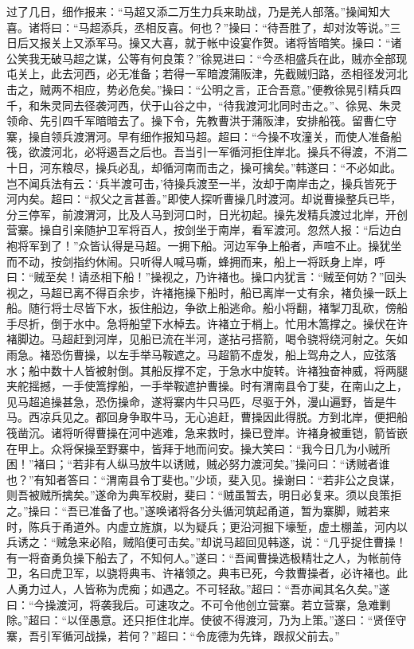 过了几日，细作报来：“马超又添二万生力兵来助战，乃是羌人部落。”操闻知大喜。诸将曰：“马超添兵，丞相反喜。何也？”操曰：“待吾胜了，却对汝等说。”三日后又报关上又添军马。操又大喜，就于帐中设宴作贺。诸将皆暗笑。操曰：“诸公笑我无破马超之谋，公等有何良策？”徐晃进曰：“今丞相盛兵在此，贼亦全部现屯关上，此去河西，必无准备；若得一军暗渡蒲阪津，先截贼归路，丞相径发河北击之，贼两不相应，势必危矣。”操曰：“公明之言，正合吾意。”便教徐晃引精兵四千，和朱灵同去径袭河西，伏于山谷之中，“待我渡河北同时击之。”、徐晃、朱灵领命、先引四千军暗暗去了。操下令，先教曹洪于蒲阪津，安排船筏。留曹仁守寨，操自领兵渡渭河。早有细作报知马超。超曰：“今操不攻潼关，而使人准备船筏，欲渡河北，必将遏吾之后也。吾当引一军循河拒住岸北。操兵不得渡，不消二十日，河东粮尽，操兵必乱，却循河南而击之，操可擒矣。”韩遂曰：“不必如此。岂不闻兵法有云：‘兵半渡可击，’待操兵渡至一半，汝却于南岸击之，操兵皆死于河内矣。超曰：“叔父之言甚善。”即使人探听曹操几时渡河。却说曹操整兵已毕，分三停军，前渡渭河，比及人马到河口时，日光初起。操先发精兵渡过北岸，开创营寨。操自引亲随护卫军将百人，按剑坐于南岸，看军渡河。忽然人报：“后边白袍将军到了！”众皆认得是马超。一拥下船。河边军争上船者，声喧不止。操犹坐而不动，按剑指约休闹。只听得人喊马嘶，蜂拥而来，船上一将跃身上岸，呼曰：“贼至矣！请丞相下船！”操视之，乃许褚也。操口内犹言：“贼至何妨？”回头视之，马超已离不得百余步，许褚拖操下船时，船已离岸一丈有余，褚负操一跃上船。随行将士尽皆下水，扳住船边，争欲上船逃命。船小将翻，褚掣刀乱砍，傍船手尽折，倒于水中。急将船望下水棹去。许褚立于梢上。忙用木篙撑之。操伏在许褚脚边。马超赶到河岸，见船已流在半河，遂拈弓搭箭，喝令骁将绕河射之。矢如雨急。褚恐伤曹操，以左手举马鞍遮之。马超箭不虚发，船上驾舟之人，应弦落水；船中数十人皆被射倒。其船反撑不定，于急水中旋转。许褚独奋神威，将两腿夹舵摇撼，一手使篙撑船，一手举鞍遮护曹操。时有渭南县令丁斐，在南山之上，见马超追操甚急，恐伤操命，遂将寨内牛只马匹，尽驱于外，漫山遍野，皆是牛马。西凉兵见之。都回身争取牛马，无心追赶，曹操因此得脱。方到北岸，便把船筏凿沉。诸将听得曹操在河中逃难，急来救时，操已登岸。许褚身被重铠，箭皆嵌在甲上。众将保操至野寨中，皆拜于地而问安。操大笑曰：“我今日几为小贼所困！”褚曰；“若非有人纵马放牛以诱贼，贼必努力渡河矣。”操问曰：“诱贼者谁也？”有知者答曰：“渭南县令丁斐也。”少顷，斐入见。操谢曰：“若非公之良谋，则吾被贼所擒矣。”遂命为典军校尉，斐曰：“贼虽暂去，明日必复来。须以良策拒之。”操曰：“吾已准备了也。”遂唤诸将各分头循河筑起甬道，暂为寨脚，贼若来时，陈兵于甬道外。内虚立旌旗，以为疑兵；更沿河掘下壕堑，虚土棚盖，河内以兵诱之：“贼急来必陷，贼陷便可击矣。”却说马超回见韩遂，说：“几乎捉住曹操！有一将奋勇负操下船去了，不知何人。”遂曰：“吾闻曹操选极精壮之人，为帐前侍卫，名曰虎卫军，以骁将典韦、许褚领之。典韦已死，今救曹操者，必许褚也。此人勇力过人，人皆称为虎痴；如遇之。不可轻敌。”超曰：“吾亦闻其名久矣。”遂曰：“今操渡河，将袭我后。可速攻之。不可令他创立营寨。若立营寨，急难剿除。”超曰：“以侄愚意。还只拒住北岸。使彼不得渡河，乃为上策。”遂曰：“贤侄守寨，吾引军循河战操，若何？”超曰：“令庞德为先锋，跟叔父前去。”

